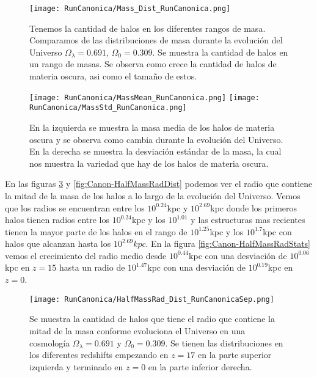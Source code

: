 \begin{figure}[H]
    \centering
    \texttt{[image: RunCanonica/Mass\_Dist\_RunCanonica.png]}
    \caption[Comparación de distribución de masa]{\footnotesize Tenemos la cantidad de halos en los diferentes rangos de masa. Comparamos de las distribuciones de masa durante la evolución del Universo $\Omega_\lambda = 0.691 $, $\Omega_0 = 0.309$. Se muestra la cantidad de halos en un rango de masas. Se observa como crece la cantidad de halos de materia oscura, asi como el tamaño de estos.}
    \label{fig:Canon-MassDist}
\end{figure}

\begin{figure}[H]
    \centering
    \texttt{[image: RunCanonica/MassMean\_RunCanonica.png]}
    \texttt{[image: RunCanonica/MassStd\_RunCanonica.png]}
    \caption[Media y desviación estándar de la distribución de masa]{\footnotesize En la izquierda se muestra la masa media de los halos de materia oscura y se observa como cambia durante la evolución del Universo. En la derecha se muestra la desviación estándar de la masa, la cual nos muestra la variedad que hay de los halos de materia oscura.}
    \label{fig:Canon-MassStats}
\end{figure}

En las figuras \ref{fig:Canon-HalfMassRadDistSep} y \ref{fig:Canon-HalfMassRadDist} podemos ver el radio que contiene la mitad de la masa de los halos a lo largo de la evolución del Universo. Vemos que los radios se encuentran entre los $10^{0.24}$kpc y $10^{2.69}$kpc donde los primeros halos tienen radios entre los $10^{0.24}$kpc y los $10^{1.01}$ y las estructuras mas recientes tienen la mayor parte de los halos en el rango de $10^{1.25}$kpc y los $10^{1.7}$kpc con halos que alcanzan hasta los $10^{2.69}kpc$. En la figura \ref{fig:Canon-HalfMassRadStats} vemos el crecimiento del radio medio desde $10^{0.44}$kpc con una desviación de $10^{0.06}$kpc en $z=15$ hasta un radio de $10^{1.47}$kpc con una desviación de $10^{0.19}$kpc en $z=0$.

\begin{figure}[H]
    \centering
    \texttt{[image: RunCanonica/HalfMassRad\_Dist\_RunCanonicaSep.png]}
    \caption[Radio que contiene la mitad de la masa]{\footnotesize Se muestra la cantidad de halos que tiene el radio que contiene la mitad de la masa conforme evoluciona el Universo en una cosmología $\Omega_\lambda = 0.691 $ y $\Omega_0 = 0.309$. Se tienen las distribuciones en los diferentes redshifts empezando en $z=17$ en la parte superior izquierda y terminado en $z=0$ en la parte inferior derecha.}
    \label{fig:Canon-HalfMassRadDistSep}
\end{figure}

